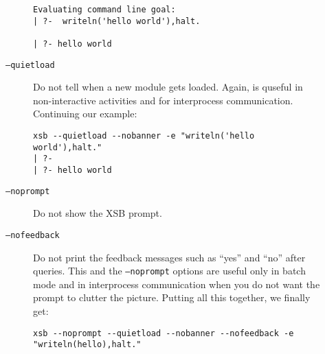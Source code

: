 \begin{description}
\begin{description}
\begin{verbatim}
Evaluating command line goal:  
| ?-  writeln('hello world'),halt.

| ?- hello world
\end{verbatim}
%
  \item[{\tt --quietload}] Do not tell when a new module gets
    loaded. Again, is quseful in non-interactive activities and for
    interprocess communication.  Continuing our example:
\begin{verbatim}
xsb --quietload --nobanner -e "writeln('hello world'),halt."
| ?- 
| ?- hello world
\end{verbatim}
%
  \item[{\tt --noprompt}] Do not show the XSB prompt.
%
\item[{\tt --nofeedback}] Do not print the feedback messages such as
  ``yes'' and ``no'' after queries.
    This and the \texttt{--noprompt} options are useful only in batch
    mode and in interprocess communication when you do not want the prompt
    to clutter the picture.  Putting all this together, we finally get: 
\begin{verbatim}
xsb --noprompt --quietload --nobanner --nofeedback -e "writeln(hello),halt."


\end{verbatim}
\end{description}
\end{description}
